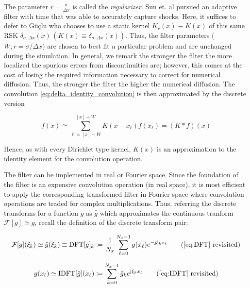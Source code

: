 \documentclass[11pt,titlepage]{report}
\begin{document}
The parameter $r = \tfrac{\sigma}{\Delta x}$ is called the \emph{regularizer}. Sun et. al pursued an adaptive filter with time that was able to accurately capture shocks. Here, it suffices to defer to G\"{u}\c{c}lu \cite{Guclu14} who chooses to use a static kernel $K_r(x) \equiv K(x)$ of this same RSK $\delta_{\sigma,\Delta x}(x)\, (K(x) \equiv \delta_{\sigma,\Delta x}(x))$. Thus, the filter parameters ($W, r = \sigma / \Delta x$) are chosen to best fit a particular problem and are unchanged during the simulation. In general, we remark the stronger the filter the more localized the spurious errors from discontinuities are; however, this comes at the cost of losing the required information necessary to correct for numerical diffusion. Thus, the stronger the filter the higher the numerical diffusion. The convolution \eqref{eq:delta_identity_convolution} is then approximated by the discrete version


\begin{equation}f(x) \simeq \sum_{\ell = [x] - W}^{[x] + W} K(x - x_{\ell})f(x_{\ell}) = (K*f)(x)\label{eq:f_discrete_convolution}\end{equation}

\noindent Hence, as with every Dirichlet type kernel, $K(x)$ is an approximation to the identity element for the convolution operation. 

The filter can be implemented in real or Fourier space. Since the foundation of the filter is an expensive convolution operation (in real space), it is most efficient to apply the corresponding transformed filter in Fourier space where convolution operations are traded for complex multiplications. Thus, referring the discrete transforms for a function $g$ as $\hat{g}$ which approximates the continuous tranform $\mathcal{F}[g] \simeq \hat{g}$, recall the definition of the discrete transform pair:

\begin{equation*}
\mathcal{F}[g](\xi_k) \simeq \hat{g}(\xi_k) \equiv \text{DFT}[g]_k  \coloneqq  \frac{1}{N_x} \sum_{\ell = 0}^{N_x - 1} g(x_\ell) e^{-\text{j}\xi_k x_{\ell}} \tag{\ref{eq:DFT} revisited}
\end{equation*}

\begin{equation*}
g(x_{\ell}) \simeq \text{IDFT}[\hat{g}](x_{\ell}) \coloneqq  \sum_{k = 0}^{N_x - 1}\hat{g}_k e^{\text{j}\xi_k x_{\ell}} \tag{\ref{eq:IDFT} revisited}\end{equation*}
\end{document}
